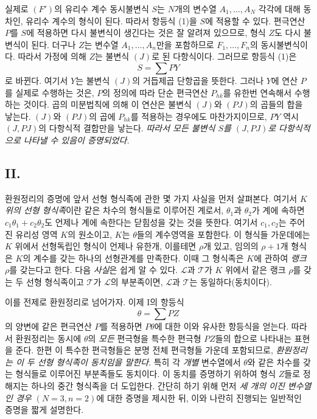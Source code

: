 실제로 $(F')$의 유리수 계수 동시불변식 $S$는 $N$개의 변수열 $A_1,\ldots,A_N$ 각각에 대해 동차인, 유리수 계수의 형식이 된다. 따라서 항등식 (1)을 $S$에 적용할 수 있다. 편극연산 $P$를 $S$에 적용하면 다시 불변식이 생긴다는 것은 잘 알려져 있으므로, 형식 $Z$도 다시 불변식이 된다. 더구나 $Z$는 변수열 $A_1,
\ldots,A_n$만을 포함하므로 $F_1,
\ldots,F_n$의 동시불변식이다. 따라서 가정에 의해 $Z$는 불변식 $(J)$로 된 다항식이다. 그러므로 항등식 (1)은
\[
  S=\sum PY
\]
로 바뀐다. 여기서 $Y$는 불변식 $(J)$의 거듭제곱 단항곱을 뜻한다. 그러나 $Y$에 연산 $P$를 실제로 수행하는 것은, $P$의 정의에 따라 단순 편극연산 $P_{hk}$를 유한번 연속해서 수행하는 것이다. 곱의 미분법칙에 의해 이 연산은 불변식 $(J)$와 $(PJ)$의 곱들의 합을 낳는다. $(J)$와 $(PJ)$의 곱에 $P_{hk}$를 적용하는 경우에도 마찬가지이므로, $PY$ 역시 $(J,PJ)$의 다항식적 결합만을 낳는다. \emph{따라서 모든 불변식 $S$를 $(J,PJ)$로 다항식적으로 나타낼 수 있음이 증명되었다.}

\subsection*{II.}
환원정리의 증명에 앞서 선형 형식족에 관한 몇 가지 사실을 먼저 살펴본다. 여기서 \emph{$K$ 위의 선형 형식족}이란 같은 차수의 형식들로 이루어진 계로서, $\theta_1$과 $\theta_2$가 계에 속하면 $c_1\theta_1+c_2\theta_2$도 언제나 계에 속한다는 닫힘성을 갖는 것을 뜻한다. 여기서 $c_1,c_2$는 주어진 유리성 영역 $K$의 원소이고, $K$는 $\theta$들의 계수영역을 포함한다. 이 형식들 가운데에는 $K$ 위에서 선형독립인 형식이 언제나 유한개, 이를테면 $\rho$개 있고, 임의의 $\rho+1$개 형식은 $K$의 계수를 갖는 하나의 선형관계를 만족한다. 이때 그 형식족은 $K$에 관하여 \emph{랭크 $\rho$}를 갖는다고 한다. 다음 \emph{사실}은 쉽게 알 수 있다. $\mathcal L$과 $\mathcal T$가 $K$ 위에서 같은 랭크 $\rho$를 갖는 두 선형 형식족이고 $\mathcal T$가 $\mathcal L$의 부분족이면, $\mathcal L$과 $\mathcal T$는 동일하다(동치이다).

이를 전제로 환원정리로 넘어가자. 이제 I의 항등식
\[
  \theta=\sum PZ
\]
의 양변에 같은 편극연산 $P$를 적용하면 $P\theta$에 대한 이와 유사한 항등식을 얻는다. 따라서 환원정리는 동시에 $\theta$의 \emph{모든} 편극형을 특수한 편극형 $PZ$들의 합으로 나타내는 표현을 준다. 한편 이 특수한 편극형들은 분명 전체 편극형들 가운데 포함되므로, \emph{환원정리는 이 두 선형 형식족이 동치임을 말한다}. 특히 각 \emph{개별} 변수열에서 $\theta$와 같은 차수를 갖는 형식들로 이루어진 부분족들도 동치이다. 이 동치를 증명하기 위하여 형식 $Z$들로 정해지는 하나의 중간 형식족을 더 도입한다. 간단히 하기 위해 먼저 \emph{세 개의 이진 변수열인 경우 $(N=3,n=2)$}에 대한 증명을 제시한 뒤, 이와 나란히 진행되는 일반적인 증명을 짧게 설명한다.

